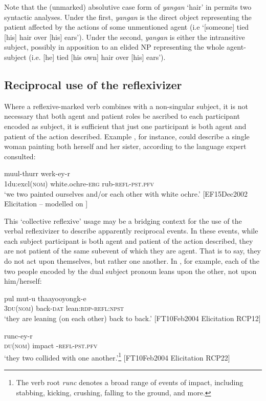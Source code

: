 \documentclass[output=paper]{langscibook}
\begin{document}
Note that the (unmarked) absolutive case form of \textit{yangan} ‘hair’ in  permits two syntactic analyses. Under the first, \textit{yangan} is the direct object representing the patient affected by the actions of some unmentioned agent (i.e ‘[someone] tied [his] hair over [his] ears’). Under the second, \textit{yangan} is either the intransitive subject, possibly in apposition to an elided NP representing the whole agent-subject (i.e. [he] tied [his own] hair over [his] ears’). 

\subsection{Reciprocal use of the reflexivizer}
\label{sec:Gaby:4.6}
Where a reflexive-marked verb combines with a non-singular subject, it is not necessary that both agent and patient roles be ascribed to each participant encoded as subject, it is sufficient that just one participant is both agent and patient of the action described. Example , for instance, could describe a single woman painting both herself and her sister, according to the language expert consulted:

\ea 
    \label{ex:Gaby:30}
      {muul-thurr}  {werk-ey-r}\\
   1du:excl(\textsc{nom})  white.ochre-\textsc{erg}  rub-\textsc{refl-pst.pfv} \\
    \glt ‘we two painted ourselves and/or each other with white ochre.’
[EF15Dec2002 Elicitation – modelled on \citealt{Hall1972}]
    \z


This ‘collective reflexive’ usage may be a bridging context for the use of the verbal reflexivizer to describe apparently reciprocal events. In these events, while each subject participant is both agent and patient of the action described, they are not patient of the same subevent of which they are agent. That is to say, they do not act upon themselves, but rather one another. In , for example, each of the two people encoded by the dual subject pronoun leans upon the other, not upon him/herself: 

\ea 
    \label{ex:Gaby:31}
    \gll pul mut-u thaayooyongk-e\\
   3\textsc{du}(\textsc{nom)}  back-\textsc{dat}  lean\textsc{:rdp-refl:npst}  \\
    \glt ‘they are leaning (on each other) back to back.’ [FT10Feb2004 Elicitation RCP12]
    \z
 

\ea 
    \label{ex:Gaby:32}
      {runc-ey-r}\\
    \textsc{du}(\textsc{nom})  impact {}-\textsc{refl-pst.pfv} \\
    \glt ‘they two collided with one another.’\footnote{The verb root \textit{runc} denotes a broad range of events of impact, including stabbing, kicking, crushing, falling to the ground, and more.} [FT10Feb2004 Elicitation RCP22]
    \z
\end{document}
